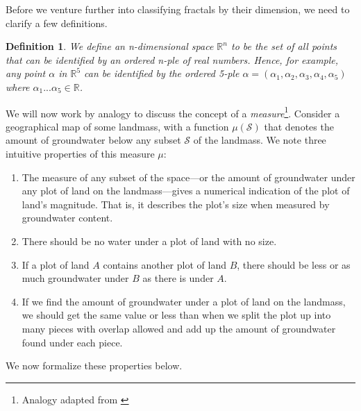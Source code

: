 Before we venture further into classifying fractals by their dimension, we need to clarify a few definitions.

\newtheorem{mydef}{Definition}
\begin{mydef}
We define an n-dimensional space $ \mathbb{R}^{n} $ to be the set of all points that can be identified by an ordered n-ple of real numbers. Hence, for example, any point $ \alpha $ in $ \mathbb{R}^{5} $ can be identified by the ordered 5-ple $ \alpha = (\alpha_{1}, \alpha_{2}, \alpha_{3}, \alpha_{4}, \alpha_{5})$ where $ \alpha_{1} ... \alpha_{5} \in \mathbb{R} $.\end{mydef}

We will now work by analogy to discuss the concept of a \textit{measure}\footnote{Analogy adapted from \citep{mandelbrotmultifractal}}. Consider a geographical map of some landmass, with a function $ \mu(\mathcal{S}) $ that denotes the amount of groundwater below any subset $ \mathcal{S} $ of the landmass. We note three intuitive properties of this measure $ \mu $:\begin{enumerate}
\item The measure of any subset of the space---or the amount of groundwater under any plot of land on the landmass---gives a numerical indication of the plot of land's magnitude. That is, it describes the plot's size when measured by groundwater content.
\item\label{measureofanullset} There should be no water under a plot of land with no size. 
\item\label{measureofsubsets} If a plot of land $ A $ contains another plot of land $ B $, there should be less or as much groundwater under $B$ as there is under $A$. 
\item\label{measureaddition} If we find the amount of groundwater under a plot of land on the landmass, we should get the same value or less than when we split the plot up into many pieces with overlap allowed and add up the amount of groundwater found under each piece. 
\end{enumerate}
We now formalize these properties below.

